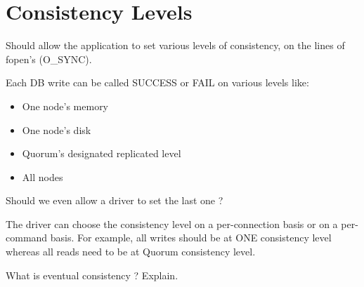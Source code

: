 \section{Consistency Levels}


Should allow the application to set various levels of consistency, on the lines of fopen's (O_SYNC).

Each DB write can be called SUCCESS or FAIL on various levels like:

\begin{itemize}
\item One node's memory
\end{itemize}
\begin{itemize}
\item One node's disk
\end{itemize}
\begin{itemize}
\item Quorum's designated replicated level
\end{itemize}
\begin{itemize}
\item All nodes
\end{itemize}

Should we even allow a driver to set the last one ?

The driver can choose the consistency level on a per-connection basis or on a per-command basis. For example, all writes should be at ONE consistency level whereas all reads need to be at Quorum consistency level.

What is eventual consistency ? Explain.
